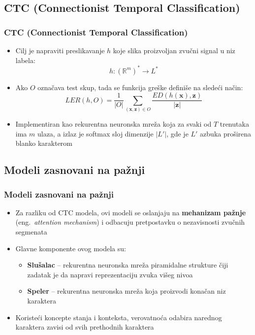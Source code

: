 \documentclass{beamer}
\begin{document}
\subsection{CTC (Connectionist Temporal Classification)}
\begin{frame}
  \frametitle{CTC (Connectionist Temporal Classification)}
  \begin{itemize}
    \item Cilj je napraviti preslikavanje $h$ koje slika proizvoljan zvučni signal u niz labela:
      \begin{equation*}
      h: (\mathbb{R}^m)^* \rightarrow L^* 
      \end{equation*}
    \item Ako $O$ označava test skup, tada se funkcija greške definiše na sledeći način:
      \begin{equation*}
      LER(h, O) = \frac{1}{|O|}\sum_{(\textbf{x}, \textbf{z}) \in O}\frac{ED(h(\textbf{x}), \textbf{z})}{|\textbf{z}|}
      \end{equation*}
    \item Implementiran kao rekurentna neuronska mreža koja za svaki od $T$ trenutaka ima $m$ ulaza, a izlaz je softmax sloj dimenzije $|L'|$, gde je $L'$ azbuka proširena blanko karakterom
  \end{itemize}  
\end{frame}

\subsection{Modeli zasnovani na pažnji}
\begin{frame}
  \frametitle{Modeli zasnovani na pažnji}
  \begin{itemize}
      \item Za razliku od CTC modela, ovi modeli se oslanjaju na \textbf{mehanizam pažnje} (eng.~{\em attention mechanism}) i odbacuju pretpostavku o nezavisnosti zvučnih segmenata
      \item Glavne komponente ovog modela su:
        \begin{itemize} 
          \item \textbf{Slušalac} -- rekurentna neuronska mreža piramidalne strukture čiji zadatak je da napravi reprezentaciju zvuka višeg nivoa
          \item \textbf{Speler} -- rekurentna neuronska mreža koja proizvodi konačan niz karaktera
        \end{itemize}
      \item Koristeći koncepte stanja i konteksta, verovatnoća odabira narednog karaktera zavisi od svih prethodnih karaktera
  \end{itemize}
\end{frame}
\end{document}
